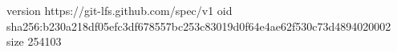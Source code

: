 version https://git-lfs.github.com/spec/v1
oid sha256:b230a218df05efc3df678557bc253c83019d0f64e4ae62f530c73d4894020002
size 254103
